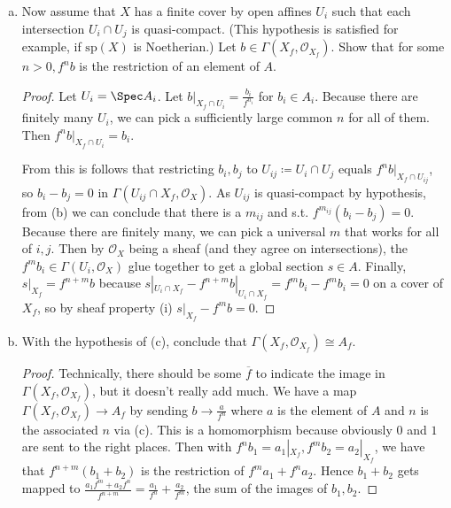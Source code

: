 \begin{exercise}
\begin{enumerate}[(a)]
\begin{proof}
		As $D(\overline{f}_i) \cong \Spec (A_i)_{\overline{f}_i }$, $a|_{X_f} = 0 \implies a|_{U_i} = 0 \in (A_i)_{\overline{f}_i}$.
		Thus $\exists n_i $ s.t. $\overline{f} _i^{n_i}a|_{U_i} = (f^{n_i}a)|_{U_i} = 0 $ in $A_i $ by definition of localizing.
		Because there are finitely many, we can take a common $n $ for all $\overline{f} _i $.
		As $\mathcal{O}_X $ is a sheaf, $f^na $ being 0 on the restictions to an open cover implies that $f^na $ is globally 0.
	\end{proof}
	\item Now assume that $X $ has a finite cover by open affines $U_i $ such that each intersection $U_i\cap U_j $ is quasi-compact. (This hypothesis is satisfied for example, if $\text{sp}(X)$ is Noetherian.) Let $b\in \Gamma(X_f,\mathcal{O}_{X_f}) $. Show that for some $n > 0, f^n b$ is the restriction of an element of $A $.
	\begin{proof}
		Let $U_i = \Spec A_i $.
		Let $b|_{X_f\cap U_i} = \frac{b_i}{f^{n_i} } $ for $b_i \in A_i $.
		Because there are finitely many $U_i $, we can pick a sufficiently large common $n $ for all of them.
		Then $f^nb|_{X_f\cap U_i} = b_i $.

		From this is follows that restricting $b_i,b_j $ to $U_{ij}\coloneqq U_i\cap U_j $ equals $f^nb|_{X_f\cap U_{ij}} $, so $b_i-b_j = 0 $ in $\Gamma(U_{ij}\cap X_f, \mathcal{O}_X) $.
		As $U_{ij} $ is quasi-compact by hypothesis, from (b) we can conclude that there is a $m_{ij} $ and s.t. $f^{m_{ij}}(b_i-b_j) = 0 $.
		Because there are finitely many, we can pick a universal $m $ that works for all of $i,j $.
		Then by $\mathcal{O}_X $ being a sheaf (and they agree on intersections), the $f^mb_i \in \Gamma(U_i,\mathcal{O}_X)$ glue together to get a global section $s \in A$.
		Finally, $s|_{X_f} = f^{n+m}b$ because $s|_{U_i\cap X_f}-f^{n+m}b|_{U_i\cap X_f} = f^mb_i-f^mb_i = 0 $ on a cover of $X_f $, so by sheaf property (i) $s|_{X_f}-f^mb = 0 $.
	\end{proof}
	\item With the hypothesis of (c), conclude that $\Gamma(X_f,\mathcal{O}_{X_f}) \cong A_f $.
	\begin{proof}
		Technically, there should be some $\overline{f}  $ to indicate the image in $\Gamma(X_f,\mathcal{O}_{X_f}) $, but it doesn't really add much.
		We have a map $\Gamma(X_f,\mathcal{O}_{X_f}) \to A_f $ by sending $b\to \frac{a}{f^n} $ where $a$ is the element of $A $ and $n $ is the associated $n $ via (c).
		This is a homomorphism because obviously 0 and $1 $ are sent to the right places.
		Then with $f^nb_{1} = a_{1}|_{X_f}, f^mb_{2} = a_{2}|_{X_f}$, we have that $f^{n+m}(b_{1}+b_{2})  $ is the restriction of $f^ma_{1}+f^na_2 $.
		Hence $b_{1}+b_{2} $ gets mapped to $\frac{a_{1}f^m + a_{2}f^n}{f^{n+m} } = \frac{a_{1}}{f^n} +\frac{a_{2}}{f^m}$, the sum of the images of $b_{1},b_{2} $.


\end{proof}
\end{enumerate}
\end{exercise}
